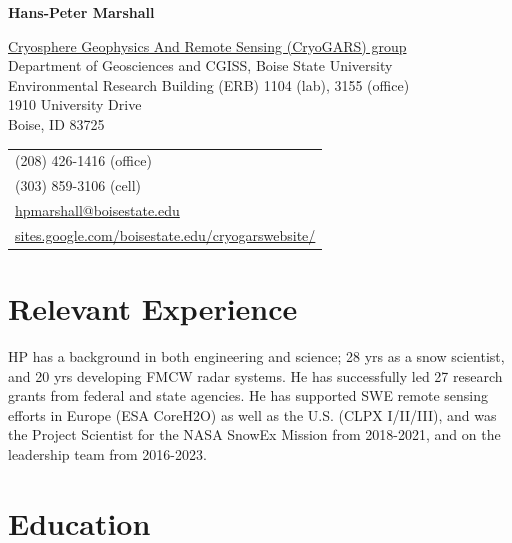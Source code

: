\documentclass[11pt]{article}
\def\name{Hans-Peter Marshall}
\begin{document}


\centerline{\Large \bf \name}

\vspace{0.25in}

\begin{minipage}{0.60\linewidth}
  \href{https://sites.google.com/boisestate.edu/cryogarswebsite/}{Cryosphere Geophysics And Remote Sensing (CryoGARS) group} \\
  Department of Geosciences and CGISS, Boise State University \\
  Environmental Research Building (ERB) 1104 (lab), 3155 (office) \\
  1910 University Drive \\
  Boise, ID  83725
\end{minipage}
\begin{minipage}{0.30\linewidth}
  \begin{tabular}{l}
     (208) 426-1416 (office) \\
     (303) 859-3106 (cell) \\
    \href{mailto:hpmarshall@boisestate.edu}{hpmarshall@boisestate.edu} \\
    \href{https://sites.google.com/boisestate.edu/cryogarswebsite/}{sites.google.com/boisestate.edu/cryogarswebsite/} \\
  \end{tabular}
\end{minipage}

\section*{Relevant Experience}
HP has a background in both engineering and science; 28 yrs as a snow scientist, and 20 yrs developing FMCW radar systems.  He has successfully led 27 research grants from federal and state agencies.  He has supported SWE remote sensing efforts in Europe (ESA CoreH2O) as well as the U.S. (CLPX I/II/III), and was the Project Scientist for the NASA SnowEx Mission from 2018-2021, and on the leadership team from 2016-2023.

\section*{Education}
\end{document}
